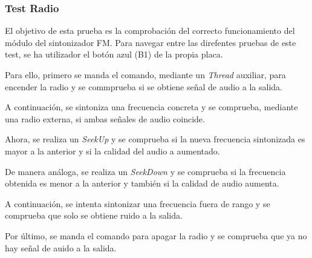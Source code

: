 \subsubsection{Test Radio}

El objetivo de esta prueba es la comprobación del correcto funcionamiento del módulo del sintonizador FM. Para navegar entre las direfentes pruebas de este test, se ha utilizador el botón azul (B1) de la propia placa.

Para ello, primero se manda el comando, mediante un \textit{Thread} auxiliar, para encender la radio y se commprueba si se obtiene señal de audio a la salida.

A continuación, se sintoniza una frecuencia concreta y se comprueba, mediante una radio externa, si ambas señales de audio coincide.

Ahora, se realiza un \textit{SeekUp} y se comprueba si la nueva frecuencia sintonizada es mayor a la anterior y si la calidad del audio a aumentado.

De manera análoga, se realiza un \textit{SeekDown} y se comprueba si la frecuencia obtenida es menor a la anterior y también si la calidad de audio aumenta.

A continuación, se intenta sintonizar una frecuencia fuera de rango y se comprueba que solo se obtiene ruido a la salida.

Por último, se manda el comando para apagar la radio y se comprueba que ya no hay señal de auido a la salida.